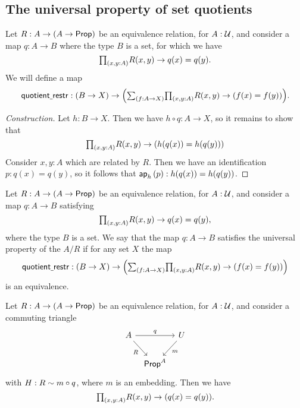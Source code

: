 \subsection{The universal property of set quotients}

\begin{defn}
Let $R:A\to (A\to \mathsf{Prop})$ be an equivalence relation, for $A:\mathcal{U}$, and consider a map $q:A\to B$ where the type $B$ is a set, for which we have
\begin{equation*}
\prd{x,y:A}R(x,y)\to q(x)=q(y).
\end{equation*}
We will define a map
\begin{equation*}
\quotientrestr:(B\to X) \to \Big(\sm{f:A\to X}\prd{x,y:A}R(x,y)\to (f(x)=f(y))\Big).
\end{equation*}
\end{defn}

\begin{proof}[Construction]
Let $h:B\to X$. Then we have $h\circ q : A\to X$, so it remains to show that
\begin{equation*}
\prd{x,y:A}R(x,y)\to (h(q(x))=h(q(y)))
\end{equation*}
Consider $x,y:A$ which are related by $R$. Then we have an identification $p:q(x)=q(y)$, so it follows that $\mathsf{ap}_{h}\left({p}\right):h(q(x))=h(q(y))$.  
\end{proof}

\begin{defn}
Let $R:A\to (A\to \mathsf{Prop})$ be an equivalence relation, for $A:\mathcal{U}$, and consider a map $q:A\to B$ satisfying
\begin{equation*}
\prd{x,y:A}R(x,y)\to q(x)=q(y),
\end{equation*}
where the type $B$ is a set. We say that the map $q:A\to B$ satisfies the universal property of the  $A/R$ if for any set $X$ the map
\begin{equation*}
\quotientrestr : (B\to X) \to \Big(\sm{f:A\to X}\prd{x,y:A}R(x,y)\to (f(x)=f(y))\Big)
\end{equation*}
is an equivalence.
\end{defn}

\begin{lem}
Let $R:A\to (A\to \mathsf{Prop})$ be an equivalence relation, for $A:\mathcal{U}$, and consider a commuting triangle
\begin{equation*}
\begin{tikzcd}[column sep=tiny]
A \arrow[rr,"q"] \arrow[dr,swap,"R"] & & U \arrow[dl,"m"] \\
& \prop^A
\end{tikzcd}
\end{equation*}
with $H:R\sim m\circ q$, where $m$ is an embedding. Then we have
\begin{equation*}
\prd{x,y:A}R(x,y)\to (q(x)=q(y)).
\end{equation*}
\end{lem}

